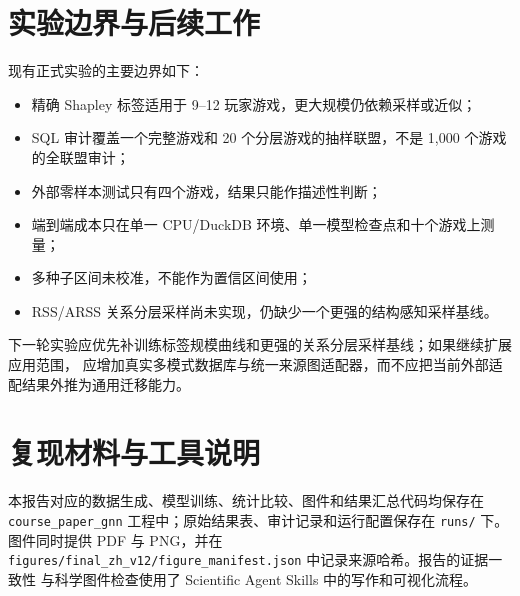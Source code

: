 \documentclass{coursepaper}
\begin{document}
\section{实验边界与后续工作}

现有正式实验的主要边界如下：
\begin{itemize}
  \item 精确 Shapley 标签适用于 9--12 玩家游戏，更大规模仍依赖采样或近似；
  \item SQL 审计覆盖一个完整游戏和 20 个分层游戏的抽样联盟，不是 1,000 个游戏的全联盟审计；
  \item 外部零样本测试只有四个游戏，结果只能作描述性判断；
  \item 端到端成本只在单一 CPU/DuckDB 环境、单一模型检查点和十个游戏上测量；
  \item 多种子区间未校准，不能作为置信区间使用；
  \item RSS/ARSS 关系分层采样尚未实现，仍缺少一个更强的结构感知采样基线。
\end{itemize}

下一轮实验应优先补训练标签规模曲线和更强的关系分层采样基线；如果继续扩展应用范围，
应增加真实多模式数据库与统一来源图适配器，而不应把当前外部适配结果外推为通用迁移能力。

\section{复现材料与工具说明}

本报告对应的数据生成、模型训练、统计比较、图件和结果汇总代码均保存在
\texttt{course\_paper\_gnn} 工程中；原始结果表、审计记录和运行配置保存在
\texttt{runs/} 下。图件同时提供 PDF 与 PNG，并在
\texttt{figures/final\_zh\_v12/figure\_manifest.json} 中记录来源哈希。报告的证据一致性
与科学图件检查使用了 Scientific Agent Skills 中的写作和可视化流程\cite{kassis2026}。

\fontsize{10pt}{12pt}\selectfont
\nocite{shapley1953,kipf2017,hamilton2017,ghorbani2019,livshits2021,deutch2022,kara2024,standke2025,luo2022,luo2024,alizad2025,abramovich2025,badewitz2020,dawande2023,kassis2026}


\finishreferencesection
\end{document}
